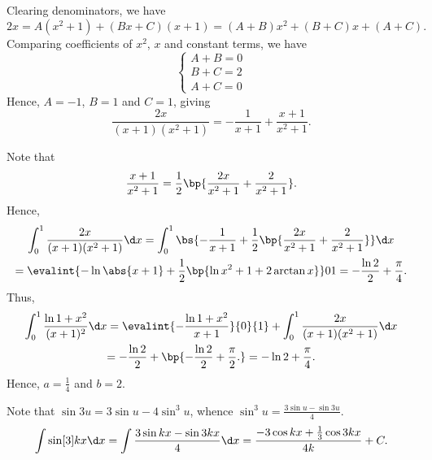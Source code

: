 \begin{solution}
    \begin{ppart}
        \begin{psubpart}
            Clearing denominators, we have \[2x = A(x^2 + 1) + (Bx + C)(x+1) = (A+B)x^2 + (B+C)x + (A + C).\]
            Comparing coefficients of $x^2$, $x$ and constant terms, we have \[\left\{\begin{aligned}
                A + B = 0\\
                B + C = 2\\
                A + C = 0
            \end{aligned}\right.\] Hence, $A = -1$, $B = 1$ and $C = 1$, giving \[\frac{2x}{(x+1)(x^2 + 1)} = -\frac1{x+1} + \frac{x+1}{x^2 + 1}.\]
        \end{psubpart}
        \begin{psubpart}
            Note that \[\frac{x+1}{x^2 + 1} = \frac12 \bp{\frac{2x}{x^2 + 1} + \frac{2}{x^2 + 1}}.\] Hence, 
            \begin{gather*}
                \int_0^1 \frac{2x}{(x+1)(x^2 + 1)} \d x = \int_0^1 \bs{-\frac1{x+1} + \frac12 \bp{\frac{2x}{x^2 + 1} + \frac{2}{x^2 + 1}}} \d x \\
                = \evalint{-\ln \abs{x+1} + \frac12 \bp{\ln{x^2 + 1} + 2\arctan x}}01 = -\frac{\ln 2}{2} + \frac\pi4.
            \end{gather*}
            Thus, 
            \begin{gather*}
                \int_0^1 \frac{\ln{1+x^2}}{(x+1)^2} \d x = \evalint{-\frac{\ln{1+x^2}}{x+1}}{0}{1} + \int_0^1 \frac{2x}{(x+1)(x^2 + 1)} \d x\\
                = -\frac{\ln2}2 + \bp{-\frac{\ln 2}{2} + \frac\pi2.} = -\ln 2 + \frac\pi4.
            \end{gather*}
            Hence, $a = \frac14$ and $b = 2$.
        \end{psubpart}
    \end{ppart}
    \begin{ppart}
        Note that $\sin 3u = 3\sin u - 4\sin^3 u$, whence $\sin^3 u = \frac{3\sin u - \sin 3u}{4}$.
        \begin{align*}
            \int \sin[3]{kx} \d x = \int \frac{3\sin{kx} - \sin{3kx}}{4} \d x = \frac{-3\cos{kx} + \frac13 \cos{3kx}}{4k} + C.
        \end{align*}
    \end{ppart}
\end{solution}

